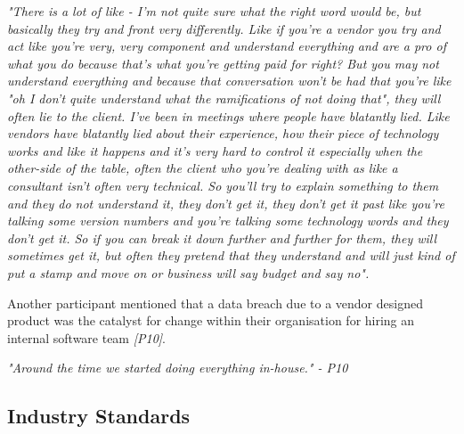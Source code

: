\textit{"There is a lot of like - I'm not quite sure what the right word would be, but basically they try and front very differently. Like if you're a vendor you try and act like you're very, very component and understand everything and are a pro of what you do because that's what you're getting paid for right? But you may not understand everything and because that conversation won't be had that you're like "oh I don't quite understand what the ramifications of not doing that", they will often lie to the client. I've been in meetings where people have blatantly lied. Like vendors have blatantly lied about their experience, how their piece of technology works and like it happens and it's very hard to control it especially when the other-side of the table, often the client who you're dealing with as like a consultant isn't often very technical. So you'll try to explain something to them and they do not understand it, they don't get it, they don't get it past like you're talking some version numbers and you're talking some technology words and they don't get it. So if you can break it down further and further for them, they will sometimes get it, but often they pretend that they understand and will just kind of put a stamp and move on or business will say budget and say no".}
\newline
\par
Another participant mentioned that a data breach due to a vendor designed product was the catalyst for change within their organisation for hiring an internal software team \textit{[P10]}.
\newline
\par
\textit{"Around the time we started doing everything in-house." - P10}

\subsection{Industry Standards}

